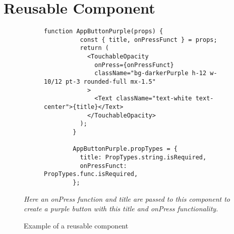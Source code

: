 \section{Reusable Component}\label{appendix:reusable}
\begin{figure}[!htbp]
    \centering
    \begin{subfigure}[b]{0.9\textwidth}
        \begin{lstlisting}[language=jsJsx]
        function AppButtonPurple(props) {
          const { title, onPressFunct } = props;
          return (
            <TouchableOpacity
              onPress={onPressFunct}
              className="bg-darkerPurple h-12 w-10/12 pt-3 rounded-full mx-1.5"
            >
              <Text className="text-white text-center">{title}</Text>
            </TouchableOpacity>
          );
        }
        
        AppButtonPurple.propTypes = {
          title: PropTypes.string.isRequired,
          onPressFunct: PropTypes.func.isRequired,
        };
        \end{lstlisting}
    \end{subfigure}
    \caption{Example of a reusable component}
    \small\textit{Here an onPress function and title are passed to this component to create a purple button with this title and onPress functionality. }
    \label{fig:tailwind}
\end{figure}
\FloatBarrier